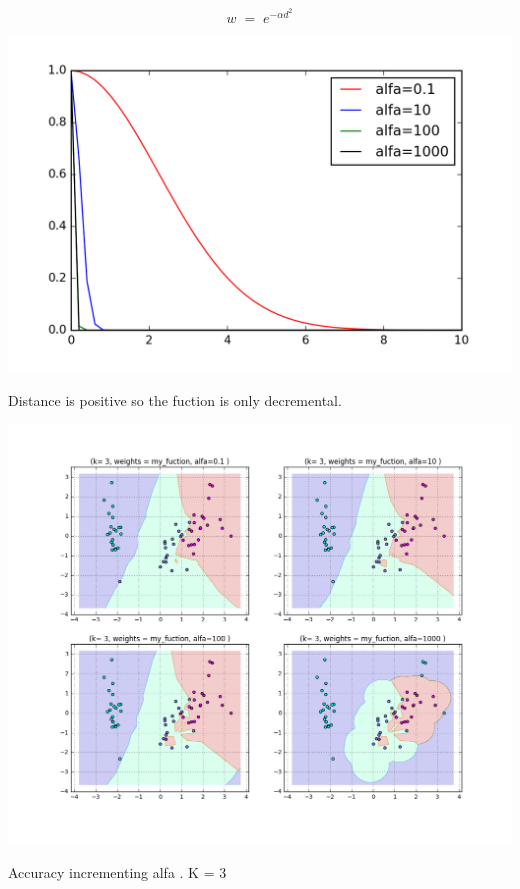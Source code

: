 \documentclass[11pt]{article}
\theoremstyle{plain}
\begin{document}
$$w\; =\; e^{-\alpha d^{2}} $$ 

\begin{center}
\includegraphics[scale=0.70]{gauss}
\end{center}
Distance is positive so the fuction is only decremental.


\begin{center}
\includegraphics[scale=0.5]{4}
\end{center}

\begin{center}
Accuracy incrementing alfa . K = 3 
\end{center}
\end{document}
